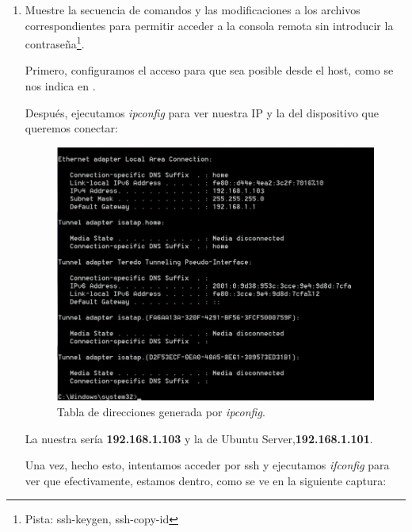 \documentclass[paper=a4, fontsize=11pt]{scrartcl} %
\numberwithin{equation}{section} %
\numberwithin{figure}{section} %
\numberwithin{table}{section} %
\begin{document}
\begin{enumerate}
		
		\item Muestre la secuencia de comandos y las modificaciones a los archivos correspondientes
		para permitir acceder a la consola remota sin introducir la contraseña\footnote{Pista: ssh-keygen,
		ssh-copy-id}.
		
		Primero, configuramos el acceso para que sea posible desde el host, como se nos indica en
		\cite{SSH_StackOverFlow}.
		
		Después, ejecutamos \textit{ipconfig} para ver nuestra IP y la del dispositivo que queremos
		conectar:
		
		\begin{figure}[H]
			\centering
			\includegraphics[width=15cm]{Ejercicio_8a.jpg}
			\caption{Tabla de direcciones generada por \textit{ipconfig}.}
			\label{fig:ipconfig}	
		\end{figure}
		
		La nuestra sería \textbf{192.168.1.103} y la de Ubuntu Server,\textbf{192.168.1.101}.
		
		Una vez, hecho esto, intentamos acceder por ssh y ejecutamos \textit{ifconfig} para ver que
		efectivamente, estamos dentro, como se ve en la siguiente captura:
		

\end{enumerate}
\end{document}
